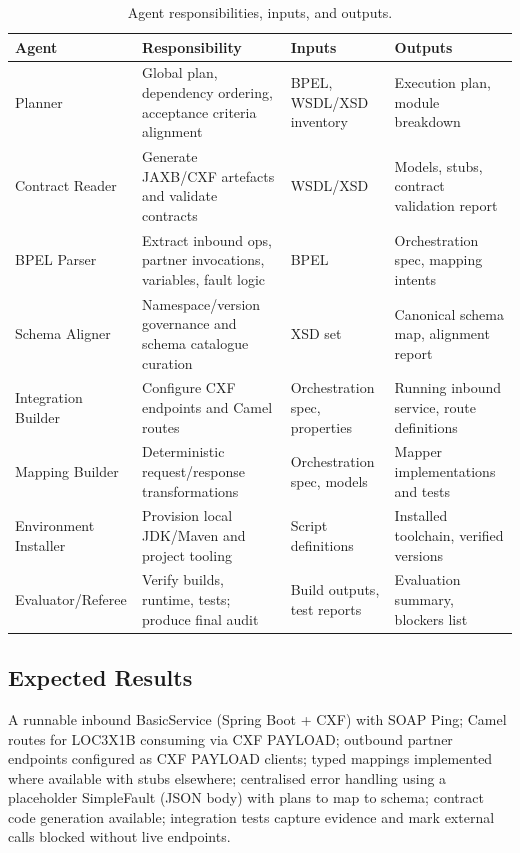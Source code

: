 \documentclass[11pt,a4paper]{article}
\begin{document}
\renewcommand{\arraystretch}{1.2}
\begin{table}[ht]
\centering
\renewcommand{\arraystretch}{1.2}
\caption{Agent responsibilities, inputs, and outputs.}\label{tab:agent-summary}
\begin{tabular}{|>{\raggedright\arraybackslash}p{3cm}|>{\raggedright\arraybackslash}p{6cm}|>{\raggedright\arraybackslash}p{3.5cm}|>{\raggedright\arraybackslash}p{3.5cm}|}
\hline
\textbf{Agent} & \textbf{Responsibility} & \textbf{Inputs} & \textbf{Outputs} \\
\hline
Planner & Global plan, dependency ordering, acceptance criteria alignment & BPEL, WSDL/XSD inventory & Execution plan, module breakdown \\
\hline
Contract Reader & Generate JAXB/CXF artefacts and validate contracts & WSDL/XSD & Models, stubs, contract validation report \\
\hline
BPEL Parser & Extract inbound ops, partner invocations, variables, fault logic & BPEL & Orchestration spec, mapping intents \\
\hline
Schema Aligner & Namespace/version governance and schema catalogue curation & XSD set & Canonical schema map, alignment report \\
\hline
Integration Builder & Configure CXF endpoints and Camel routes & Orchestration spec, properties & Running inbound service, route definitions \\
\hline
Mapping Builder & Deterministic request/response transformations & Orchestration spec, models & Mapper implementations and tests \\
\hline

\hline
Environment Installer & Provision local JDK/Maven and project tooling & Script definitions & Installed toolchain, verified versions \\
\hline
Evaluator/Referee & Verify builds, runtime, tests; produce final audit & Build outputs, test reports & Evaluation summary, blockers list \\
\hline
\end{tabular}
\end{table}



\subsection{Expected Results}
A runnable inbound BasicService (Spring Boot + CXF) with SOAP Ping; Camel routes for LOC3X1B consuming via CXF PAYLOAD; outbound partner endpoints configured as CXF PAYLOAD clients; typed mappings implemented where available with stubs elsewhere; centralised error handling using a placeholder SimpleFault (JSON body) with plans to map to schema; contract code generation available; integration tests capture evidence and mark external calls blocked without live endpoints.
\end{document}
